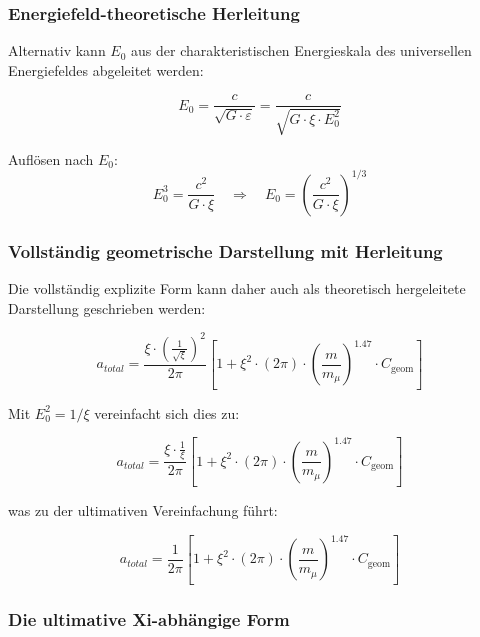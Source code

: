 \documentclass[12pt,a4paper]{article}
\numberwithin{equation}{section}
\newcommand{\xipar}{\xi}
\newcommand{\Cgeom}{C_{\text{geom}}}
\newcommand{\mmu}{m_{\mu}}
\begin{document}
	\subsubsection{Energiefeld-theoretische Herleitung}
	
	Alternativ kann $E_0$ aus der charakteristischen Energieskala des universellen Energiefeldes abgeleitet werden:
	
	\begin{equation}
		E_0 = \frac{c}{\sqrt{G \cdot \varepsilon}} = \frac{c}{\sqrt{G \cdot \xipar \cdot E_0^2}}
	\end{equation}
	
	Auflösen nach $E_0$:
	\begin{equation}
		E_0^3 = \frac{c^2}{G \cdot \xipar} \quad \Rightarrow \quad E_0 = \left(\frac{c^2}{G \cdot \xipar}\right)^{1/3}
	\end{equation}
	
	\subsubsection{Vollständig geometrische Darstellung mit Herleitung}
	
	Die vollständig explizite Form kann daher auch als theoretisch hergeleitete Darstellung geschrieben werden:
	
	\begin{equation}
		\boxed{a_{total} = \frac{\xipar \cdot \left(\frac{1}{\sqrt{\xipar}}\right)^2}{2\pi} \left[1 + \xipar^2 \cdot (2\pi) \cdot \left(\frac{m}{\mmu}\right)^{1.47} \cdot \Cgeom\right]}
	\end{equation}
	
	Mit $E_0^2 = 1/\xipar$ vereinfacht sich dies zu:
	
	\begin{equation}
		\boxed{a_{total} = \frac{\xipar \cdot \frac{1}{\xipar}}{2\pi} \left[1 + \xipar^2 \cdot (2\pi) \cdot \left(\frac{m}{\mmu}\right)^{1.47} \cdot \Cgeom\right]}
	\end{equation}
	
	was zu der ultimativen Vereinfachung führt:
	
	\begin{equation}
		\boxed{a_{total} = \frac{1}{2\pi} \left[1 + \xipar^2 \cdot (2\pi) \cdot \left(\frac{m}{\mmu}\right)^{1.47} \cdot \Cgeom\right]}
	\end{equation}
	
	\subsubsection{Die ultimative Xi-abhängige Form}
	
\end{document}
